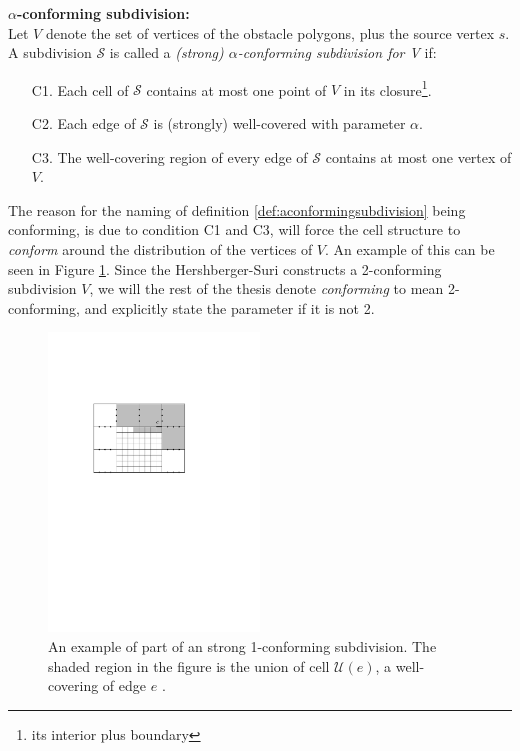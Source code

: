 \begin{mydef}
	\label{def:aconformingsubdivision}
	\textbf{$\alpha$-conforming subdivision:} \\
	Let $V$ denote the set of vertices of the obstacle polygons, plus the source
	vertex $s$. A subdivision $\mathcal{S}$ is called a \textit{(strong)
	$\alpha$-conforming subdivision for V} if:
	\begin{enumerate}
    \setlength\itemsep{1em}
		\item[C1.] Each cell of $\mathcal{S}$ contains at most one point of $V$ in its
				   closure\footnote{its interior plus boundary}.
		\item[C2.] Each edge of $\mathcal{S}$ is (strongly) well-covered with
				   parameter $\alpha$.
		\item[C3.] The well-covering region of every edge of $\mathcal{S}$ contains at
				   most one vertex of $V$.
	\end{enumerate}
\end{mydef}

The reason for the naming of definition \ref{def:aconformingsubdivision} being 
conforming, is due to condition C1 and C3, will force the cell structure to 
\textit{conform} around the distribution of the vertices of $V$. An example of this can 
be seen in Figure \ref{fig:1conformingsubdivision}. Since the Hershberger-Suri
constructs a 2-conforming subdivision $V$, we will the rest of the thesis
denote \textit{conforming} to 
mean 2-conforming, and explicitly state the parameter if it is 
not 2. 

\begin{figure}
	\centering
	\includegraphics[width=0.5\textwidth]{figures/1conformingsubdivision.pdf}
	\caption{An example of part of an strong 1-conforming subdivision. The shaded region 
    		 in the figure is the union of cell $\mathcal{U}(e)$, a well-covering 
             of edge $e$ \cite{HershbergerS99}.}
	\label{fig:1conformingsubdivision}
\end{figure}

